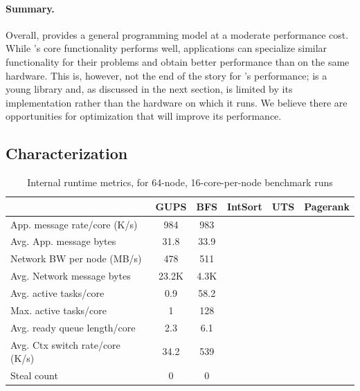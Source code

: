 \paragraph{Summary.}

Overall, \Grappa provides a general programming model at a moderate
performance cost. While \Grappa's core functionality performs well,
applications can specialize similar functionality for their problems
and obtain better performance than \Grappa on the same hardware. This
is, however, not the end of the story for \Grappa's performance;
\Grappa is a young library and, as discussed in the next section, is
limited by its implementation rather than the hardware on which it
runs. We believe there are opportunities for optimization that will
improve its performance.

\subsection{Characterization}

\begin{table}[htb]
\small
\begin{center}
\setlength{\tabcolsep}{1pt}
\begin{tabular}{l|c|c|c|c|c}
                               &   GUPS            &   BFS   & IntSort & UTS & Pagerank \\ \hline
App. message rate/core (K/s)  & 984            &  983   &      &     \\
Avg. App. message bytes & 31.8              & 33.9    &      & \\
Network BW per node (MB/s)    & 478           & 511 &    &      \\
Avg. Network message bytes     & 23.2K             & 4.3K    & &    \\ \hline
Avg. active tasks/core         & 0.9               & 58.2    &  &  \\
Max. active tasks/core         & 1                 & 128     &  &   \\
Avg. ready queue length/core   & 2.3               & 6.1     &  &    \\
Avg. Ctx switch rate/core (K/s) & 34.2           & 539  &     &  \\ 
Steal count                    & 0                 & 0       &  &     \\
\end{tabular}
\end{center}
\caption{Internal runtime metrics, for 64-node, 16-core-per-node benchmark runs}
\label{tab:grappa-metrics}
\end{table}

